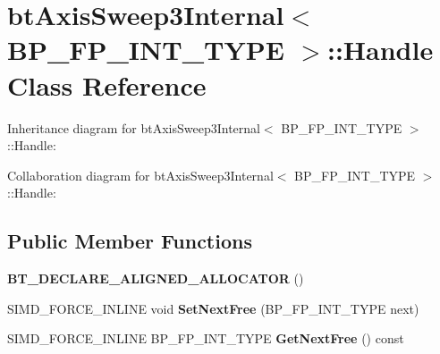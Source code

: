 \hypertarget{classbt_axis_sweep3_internal_1_1_handle}{\section{bt\+Axis\+Sweep3\+Internal$<$ B\+P\+\_\+\+F\+P\+\_\+\+I\+N\+T\+\_\+\+T\+Y\+P\+E $>$\+:\+:Handle Class Reference}
\label{classbt_axis_sweep3_internal_1_1_handle}
}


Inheritance diagram for bt\+Axis\+Sweep3\+Internal$<$ B\+P\+\_\+\+F\+P\+\_\+\+I\+N\+T\+\_\+\+T\+Y\+P\+E $>$\+:\+:Handle\+:


Collaboration diagram for bt\+Axis\+Sweep3\+Internal$<$ B\+P\+\_\+\+F\+P\+\_\+\+I\+N\+T\+\_\+\+T\+Y\+P\+E $>$\+:\+:Handle\+:
\subsection*{Public Member Functions}
\begin{DoxyCompactItemize}
\item 
\hypertarget{classbt_axis_sweep3_internal_1_1_handle_ac450e928bd2366f3ef261614603e7861}{{\bfseries B\+T\+\_\+\+D\+E\+C\+L\+A\+R\+E\+\_\+\+A\+L\+I\+G\+N\+E\+D\+\_\+\+A\+L\+L\+O\+C\+A\+T\+O\+R} ()}\label{classbt_axis_sweep3_internal_1_1_handle_ac450e928bd2366f3ef261614603e7861}

\item 
\hypertarget{classbt_axis_sweep3_internal_1_1_handle_a6e6eb1bf1e98c16b01bf71f5f479c7ff}{S\+I\+M\+D\+\_\+\+F\+O\+R\+C\+E\+\_\+\+I\+N\+L\+I\+N\+E void {\bfseries Set\+Next\+Free} (B\+P\+\_\+\+F\+P\+\_\+\+I\+N\+T\+\_\+\+T\+Y\+P\+E next)}\label{classbt_axis_sweep3_internal_1_1_handle_a6e6eb1bf1e98c16b01bf71f5f479c7ff}

\item 
\hypertarget{classbt_axis_sweep3_internal_1_1_handle_a64248e265ec7e53df575a31bd87aef09}{S\+I\+M\+D\+\_\+\+F\+O\+R\+C\+E\+\_\+\+I\+N\+L\+I\+N\+E B\+P\+\_\+\+F\+P\+\_\+\+I\+N\+T\+\_\+\+T\+Y\+P\+E {\bfseries Get\+Next\+Free} () const }\label{classbt_axis_sweep3_internal_1_1_handle_a64248e265ec7e53df575a31bd87aef09}

\end{DoxyCompactItemize}
